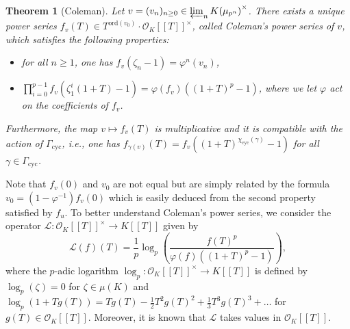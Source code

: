 \documentclass[12pt]{amsart}
\newcommand\cL{\mathcal{L}}
\newcommand\cO{\mathcal{O}}
\newcommand{\ord}{\mathrm{ord}}
\DeclareMathOperator{\cyc}{cyc}
\theoremstyle{defstyle}
\theoremstyle{thmstyle}
\newtheorem{theorem}[subsubsection]{Theorem}
\begin{document}
\begin{theorem}[Coleman]\label{thm:coleman_power_series}
	Let $v=(v_n)_{n\geq 0} \in \varprojlim_n {K(\mu_{p^n})}^\times$. There exists a unique power series $f_v(T) \in T^{\ord(v_0)}\cdot\cO_K[[T]]^\times$, called \emph{Coleman's power series of $v$}, which satisfies the following properties:
	\begin{itemize}
		\item for all $n\geq 1$, one has $f_v(\zeta_n-1)=\varphi^n(v_n)$,
		\item $\prod_{i=0}^{p-1}f_v(\zeta_1^i(1+T)-1)=\varphi(f_v)((1+T)^p-1)$, where we let $\varphi$ act on the coefficients of $f_v$.
	\end{itemize}
	Furthermore, the map $v\mapsto f_v(T)$ is multiplicative and it is compatible with the action of $\Gamma_{{\cyc}}$, \textit{i.e.}, one has $f_{\gamma(v)}(T)=f_v((1+T)^{\chi_{\cyc}(\gamma)}-1)$ for all $\gamma\in \Gamma_{\cyc}$.
\end{theorem}
Note that $f_v(0)$ and $v_0$ are not equal but are simply related by the formula $v_0=(1-\varphi^{-1})f_v(0)$ which is easily deduced from the second property satisfied by $f_u$. To better understand Coleman's power series, we consider the operator $\cL : \cO_K[[T]]^\times \longrightarrow K[[T]]$ given by 
$$\cL(f)(T)= \frac{1}{p}\log_p\left(\frac{f(T)^p}{\varphi(f)((1+T)^p-1)}\right),$$ 
where the $p$-adic logarithm $\log_p : \cO_K[[T]]^\times \longrightarrow K[[T]]$ is defined by $\log_p(\zeta)=0$ for $\zeta \in \mu(K)$ and $\log_p(1+Tg(T))= Tg(T)-\frac{1}{2}T^2g(T)^2+\frac{1}{3}T^3g(T)^3 + \ldots$ for $g(T)\in \cO_K[[T]]$. Moreover, it is known that $\cL$ takes values in $\cO_K[[T]]$. 
\end{document}
